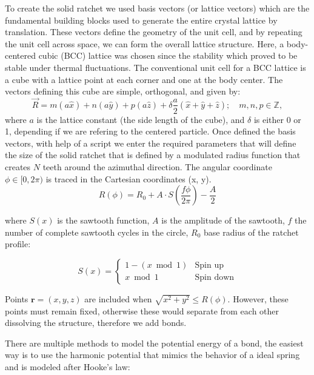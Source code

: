 To create the solid ratchet we used basis vectors (or lattice vectors) which are the fundamental building blocks used to generate the entire crystal lattice by translation. These vectors define the geometry of the unit cell, and by repeating the unit cell across space, we can form the overall lattice structure. Here, a body-centered cubic (BCC) lattice was chosen since the stability which proved to be stable under thermal fluctuations.
The conventional unit cell for a BCC lattice is a cube with a lattice point at each corner and one at the body center. The vectors defining this cube are simple, orthogonal, and given by:
%
\begin{equation}
  \vec{R} = m(a\hat{x}) + n(a\hat{y}) + p(a\hat{z}) + \delta \frac{a}{2}(\hat{x} + \hat{y} + \hat{z}); \quad m,n,p \in \mathbb{Z},
\end{equation}
%
where \( a \) is the lattice constant (the side length of the cube), and $\delta$ is either 0 or 1, depending if we are refering to the centered particle. Once defined the basis vectors, with help of a script we enter the required parameters that will define the size of the solid ratchet that is defined by a modulated radius function that creates $N$ teeth around the azimuthal direction. The angular coordinate $\phi \in [0, 2\pi)$ is traced in the Cartesian coordinates (x, y).
\begin{equation}
R(\phi) = R_0 + A \cdot S\left(\frac{f\phi}{2\pi}\right) - \frac{A}{2}
\end{equation}

where $S(x)$ is the sawtooth function, $A$ is the amplitude of the sawtooth, $f$ the number of complete sawtooth cycles in the circle, $R_0$ base radius of the ratchet profile:

\begin{equation}
S(x) = \begin{cases}
1 - (x \bmod 1) & \text{Spin up} \\
x \bmod 1 & \text{Spin down}
\end{cases}
\end{equation}

Points $\mathbf{r} = (x, y, z)$ are included when $\sqrt{x^2 + y^2} \leq R(\phi)$.
However, these points must remain fixed, otherwise these would separate from each other dissolving the structure, therefore we add bonds.

There are multiple methods to model the potential energy of a bond, the easiest way is to use the harmonic potential that mimics the behavior of a ideal spring and is modeled after Hooke's law:

